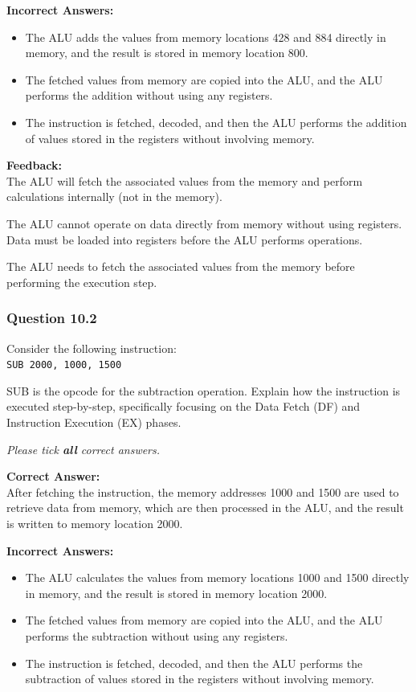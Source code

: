 \textbf{Incorrect Answers:}
\begin{itemize}
  \item The ALU adds the values from memory locations 428 and 884 directly in memory, and the result is stored in memory location 800.
  \item The fetched values from memory are copied into the ALU, and the ALU performs the addition without using any registers.
  \item The instruction is fetched, decoded, and then the ALU performs the addition of values stored in the registers without involving memory.
\end{itemize}

\textbf{Feedback:} \\
The ALU will fetch the associated values from the memory and perform calculations internally (not in the memory).

The ALU cannot operate on data directly from memory without using registers. Data must be loaded into registers before the ALU performs operations.

The ALU needs to fetch the associated values from the memory before performing the execution step.

\subsubsection{Question 10.2}

Consider the following instruction: \\
\texttt{SUB 2000, 1000, 1500}

SUB is the opcode for the subtraction operation. Explain how the instruction is executed step-by-step, specifically focusing on the Data Fetch (DF) and Instruction Execution (EX) phases.

\textit{Please tick \textbf{all} correct answers.}

\textbf{Correct Answer:} \\
After fetching the instruction, the memory addresses 1000 and 1500 are used to retrieve data from memory, which are then processed in the ALU, and the result is written to memory location 2000.

\textbf{Incorrect Answers:}
\begin{itemize}
  \item The ALU calculates the values from memory locations 1000 and 1500 directly in memory, and the result is stored in memory location 2000.
  \item The fetched values from memory are copied into the ALU, and the ALU performs the subtraction without using any registers.
  \item The instruction is fetched, decoded, and then the ALU performs the subtraction of values stored in the registers without involving memory.
\end{itemize}

